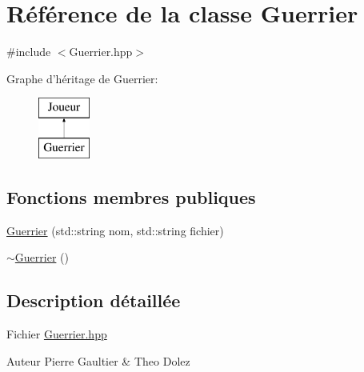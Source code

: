 \hypertarget{class_guerrier}{\section{Référence de la classe Guerrier}
\label{class_guerrier}
}


{\ttfamily \#include $<$Guerrier.\-hpp$>$}

Graphe d'héritage de Guerrier\-:\begin{figure}[H]
\begin{center}
\leavevmode
\includegraphics[height=2.000000cm]{class_guerrier}
\end{center}
\end{figure}
\subsection*{Fonctions membres publiques}
\begin{DoxyCompactItemize}
\item 
\hyperlink{class_guerrier_a08622f52e49c7fd2695ce215b3ad9aec}{Guerrier} (std\-::string nom, std\-::string fichier)
\item 
\hyperlink{class_guerrier_a83ec8ec6ced25a349249d0cdc70c75b6}{$\sim$\-Guerrier} ()
\end{DoxyCompactItemize}


\subsection{Description détaillée}
Fichier \hyperlink{_guerrier_8hpp}{Guerrier.\-hpp} \begin{DoxyAuthor}{Auteur}
Pierre Gaultier \& Theo Dolez 
\end{DoxyAuthor}


